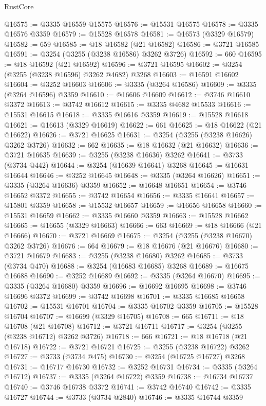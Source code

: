 \begin{lexlean}{RustCore}
\begin{coremodule}
@16575 := @3335 @16559 @15575
@16576 := @15531 @16575
@16578 := @3335 @16576 @3359
@16579 := @15528 @16578
@16581 := @16573 (@3329 @16579)
@16582 := 659
@16585 := @18 @16582 (@21 @16582)
@16586 := @3721 @16585
@16591 := @3254 (@3255 (@3238 @16586) @3262 @3726)
@16592 := 660
@16595 := @18 @16592 (@21 @16592)
@16596 := @3721 @16595
@16602 := @3254 (@3255 (@3238 @16596) @3262 @4682) @3268
@16603 := @16591 @16602
@16604 := @3252 @16603
@16606 := @3335 (@3264 @16586)
@16609 := @3335 (@3264 @16596) @3359
@16610 := @16606 @16609
@16612 := @3746 @16610 @3372
@16613 := @3742 @16612
@16615 := @3335 @4682 @15533
@16616 := @15531 @16615
@16618 := @3335 @16616 @3359
@16619 := @15528 @16618
@16621 := @16613 (@3329 @16619)
@16622 := 661
@16625 := @18 @16622 (@21 @16622)
@16626 := @3721 @16625
@16631 := @3254 (@3255 (@3238 @16626) @3262 @3726)
@16632 := 662
@16635 := @18 @16632 (@21 @16632)
@16636 := @3721 @16635
@16639 := @3255 (@3238 @16636) @3262
@16641 := @3733 (@3734 @442)
@16644 := @3254 (@16639 @16641) @3268
@16645 := @16631 @16644
@16646 := @3252 @16645
@16648 := @3335 (@3264 @16626)
@16651 := @3335 (@3264 @16636) @3359
@16652 := @16648 @16651
@16654 := @3746 @16652 @3372
@16655 := @3742 @16654
@16656 := @3335 @16641
@16657 := @15801 @3359
@16658 := @15532 @16657
@16659 := @16656 @16658
@16660 := @15531 @16659
@16662 := @3335 @16660 @3359
@16663 := @15528 @16662
@16665 := @16655 (@3329 @16663)
@16666 := 663
@16669 := @18 @16666 (@21 @16666)
@16670 := @3721 @16669
@16675 := @3254 (@3255 (@3238 @16670) @3262 @3726)
@16676 := 664
@16679 := @18 @16676 (@21 @16676)
@16680 := @3721 @16679
@16683 := @3255 (@3238 @16680) @3262
@16685 := @3733 (@3734 @470)
@16688 := @3254 (@16683 @16685) @3268
@16689 := @16675 @16688
@16690 := @3252 @16689
@16692 := @3335 (@3264 @16670)
@16695 := @3335 (@3264 @16680) @3359
@16696 := @16692 @16695
@16698 := @3746 @16696 @3372
@16699 := @3742 @16698
@16701 := @3335 @16685 @16658
@16702 := @15531 @16701
@16704 := @3335 @16702 @3359
@16705 := @15528 @16704
@16707 := @16699 (@3329 @16705)
@16708 := 665
@16711 := @18 @16708 (@21 @16708)
@16712 := @3721 @16711
@16717 := @3254 (@3255 (@3238 @16712) @3262 @3726)
@16718 := 666
@16721 := @18 @16718 (@21 @16718)
@16722 := @3721 @16721
@16725 := @3255 (@3238 @16722) @3262
@16727 := @3733 (@3734 @475)
@16730 := @3254 (@16725 @16727) @3268
@16731 := @16717 @16730
@16732 := @3252 @16731
@16734 := @3335 (@3264 @16712)
@16737 := @3335 (@3264 @16722) @3359
@16738 := @16734 @16737
@16740 := @3746 @16738 @3372
@16741 := @3742 @16740
@16742 := @3335 @16727
@16744 := @3733 (@3734 @2840)
@16746 := @3335 @16744 @3359

\end{coremodule}
\end{lexlean}
